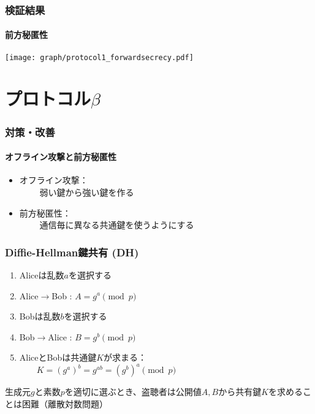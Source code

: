 \documentclass[dvipdfmx, dvipsnames, 11pt]{beamer}
\begin{document}
\begin{frame}[fragile]
  \frametitle{検証結果}
  \framesubtitle{前方秘匿性}

  \texttt{[image: graph/protocol1\_forwardsecrecy.pdf]}
\end{frame}

\section{プロトコル\scriptsize$\beta$}

\begin{frame}
  \frametitle{対策・改善}
  \framesubtitle{オフライン攻撃と前方秘匿性}

  \begin{itemize}
    \item オフライン攻撃：\\~~~~ 弱い鍵から強い鍵を作る
    \vspace{1em}
    \item 前方秘匿性：\\~~~~ 通信毎に異なる共通鍵を使うようにする
  \end{itemize}
\end{frame}

\begin{frame}
  \frametitle{Diffie-Hellman鍵共有 (DH)}

  \begin{enumerate}
    \item Aliceは乱数$a$を選択する
    \item Alice$\rightarrow$Bob : $A = g^a \pmod{p}$
    \item Bobは乱数$b$を選択する
    \item Bob$\rightarrow$Alice : $B = g^b \pmod{p}$
    \item AliceとBobは共通鍵$K$が求まる：\\~~~~$K = (g^a)^b = g^{ab} = (g^b)^a \pmod{p}$
  \end{enumerate}
  \vspace{2em}

  生成元$g$と素数$p$を適切に選ぶとき、盗聴者は公開値$A,B$から共有鍵$K$を求めることは困難（離散対数問題）
\end{frame}
\end{document}
